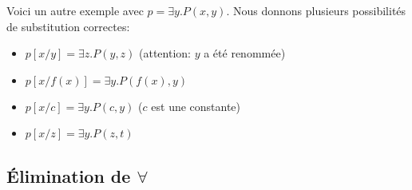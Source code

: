 Voici un autre exemple avec $p = \exists y . P(x,y)$.
Nous donnons plusieurs possibilités de substitution correctes:
\begin{itemize}
\item $p[x/y] = \exists z. P(y,z)$ (attention: $y$ a été renommée)
\item $p[x/f(x)] = \exists y. P(f(x),y)$
\item $p[x/c] = \exists y. P(c,y)$ ($c$ est une constante)
\item $p[x/z] = \exists y. P(z,t)$
\end{itemize}


\subsection{Élimination de $\forall$}
